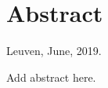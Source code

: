\chapter*{Abstract\hfill} 

\begin{flushright}
Leuven, June, 2019.
\end{flushright}

Add abstract here.
